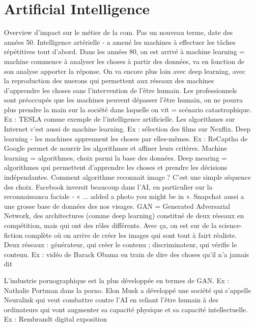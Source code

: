 \vspace{-1.2cm}

\section{Artificial Intelligence}

Overview d'impact sur le métier de la com. Pas un nouveau terme, date des années 50.
Intelligence artérielle - a amené les machines à effectuer les tâches répétitives tout d'abord. Dans les années
80, on est arrivé à machine learning = machine commence à analyser les choses à partir des données, va en
fonction de son analyse apporter la réponse. On va encore plus loin avec deep learning, avec la reproduction
des nuerons qui permettent aux réseaux des machines d'apprendre les choses sans l'intervention de l'être
humain. Les professionnels sont préoccupés que les machines peuvent dépasser l'être humain, on ne pourra
plus prendre la main sur la société dans laquelle on vit = scénario catastrophique.
Ex : TESLA comme exemple de l'intelligence artificielle.
Les algorithmes sur Internet c'est aussi de machine learning. Ex : sélection des films sur Nexflix.
Deep learning - les machines apprennent les choses par elles-mêmes. Ex : ReCaptha de Google permet de
nourrir les algorithmes et affiner leurs critères. Machine learning = algorithmes, choix parmi la base des
données. Deep mearing = algorithmes qui permettent d'apprendre les choses et prendre les décisions
indépendantes.
Comment algorithme reconnait image ? C'est une simple séquence des choix.
Facebook inversit beaucoup dans l'AI, en particulier sur la reconnaissanca faciale - « ... added a photo you
might be in ». Snapchat aussi a une grosse base de données des nos visages.
GAN = Generated Adversarial Network, des architectures (comme deep learning) constitué de deux réseaux en
compétition, mais qui ont des rôles différents. Avec ça, on est sur de la science-fiction complète où on arrive de
créer les images qui sont tout à fairt réaliste. Deux réseaux : générateur, qui créer le contenu ; discriminateur,
qui vérifie le contenu.
Ex : vidéo de Barack Obama en train de dire des choses qu'il n'a jamais dit

L'industrie pornographique est la plus développée en termes de GAN. Ex : Nathalie Portman dans la porno.
Elon Musk a développé une société qui s'appelle Neuralink qui veut combattre contre l'AI en reliant l'être
humain à des ordinateurs qui vont augmenter sa capacité physique et sa capacité intellectuelle.
Ex : Rembrandt digital exposition
